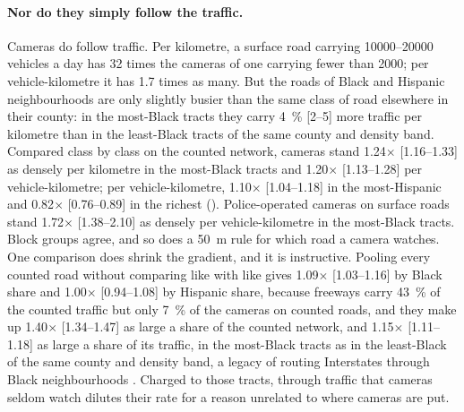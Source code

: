 \documentclass[11pt,twoside]{article}
\begin{document}
\paragraph{Nor do they simply follow the traffic.} Cameras do follow traffic. Per kilometre, a
surface road carrying \numrange{10000}{20000} vehicles a day has 32 times the cameras of one
carrying fewer than \num{2000}; per vehicle-kilometre it has \num{1.7} times as many. But the
roads of Black and Hispanic neighbourhoods are only slightly busier than the same class of road
elsewhere in their county: in the most-Black tracts they carry \SI{4}{\percent} [2--5] more
traffic per kilometre than in the least-Black tracts of the same county and density band.
Compared class by class on the counted network, cameras stand \num{1.24}$\times$ [1.16--1.33] as
densely per kilometre in the most-Black tracts and \num{1.20}$\times$ [1.13--1.28] per
vehicle-kilometre; per vehicle-kilometre, \num{1.10}$\times$ [1.04--1.18] in the most-Hispanic
and \num{0.82}$\times$ [0.76--0.89] in the richest (). Police-operated cameras on
surface roads stand \num{1.72}$\times$ [1.38--2.10] as densely per vehicle-kilometre in the
most-Black tracts. Block groups agree, and so does a \SI{50}{\metre} rule for which road a camera
watches. One comparison does shrink the gradient, and it is instructive. Pooling every counted
road without comparing like with like gives \num{1.09}$\times$ [1.03--1.16] by Black share and
\num{1.00}$\times$ [0.94--1.08] by Hispanic share, because freeways carry \SI{43}{\percent} of the
counted traffic but only \SI{7}{\percent} of the cameras on counted roads, and they make up \num{1.40}$\times$
[1.34--1.47] as large a share of the counted network, and \num{1.15}$\times$ [1.11--1.18] as
large a share of its traffic, in the most-Black tracts as in the least-Black of the same county
and density band, a legacy of routing Interstates through Black
neighbourhoods \citep{archer2020}. Charged to those tracts, through traffic that cameras seldom
watch dilutes their rate for a reason unrelated to where cameras are put.
\end{document}
